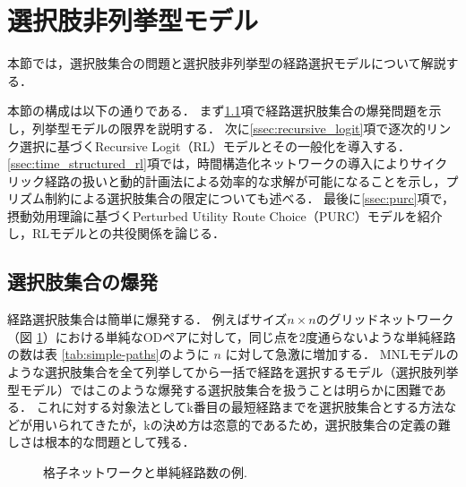 
\section{選択肢非列挙型モデル}\label{sec:choiceset}
本節では，選択肢集合の問題と選択肢非列挙型の経路選択モデルについて解説する．

本節の構成は以下の通りである．
まず\ref{ssec:choiceset_explosion}項で経路選択肢集合の爆発問題を示し，列挙型モデルの限界を説明する．
次に\ref{ssec:recursive_logit}項で逐次的リンク選択に基づくRecursive Logit（RL）モデルとその一般化を導入する．
\ref{ssec:time_structured_rl}項では，時間構造化ネットワークの導入によりサイクリック経路の扱いと動的計画法による効率的な求解が可能になることを示し，プリズム制約による選択肢集合の限定についても述べる．
最後に\ref{ssec:purc}項で，摂動効用理論に基づくPerturbed Utility Route Choice（PURC）モデルを紹介し，RLモデルとの共役関係を論じる．

\subsection{選択肢集合の爆発}\label{ssec:choiceset_explosion}
経路選択肢集合は簡単に爆発する．
例えばサイズ$n \times n$のグリッドネットワーク（図 \ref{fig:grid-paths}）における単純なODペアに対して，同じ点を2度通らないような単純経路の数は表 \ref{tab:simple-paths}のように $n$ に対して急激に増加する．
MNLモデルのような選択肢集合を全て列挙してから一括で経路を選択するモデル（選択肢列挙型モデル）ではこのような爆発する選択肢集合を扱うことは明らかに困難である．
これに対する対象法としてk番目の最短経路までを選択肢集合とする方法などが用いられてきたが，kの決め方は恣意的であるため，選択肢集合の定義の難しさは根本的な問題として残る．

\begin{figure}[htb]
  \centering
  \resizebox{.4\linewidth}{!}{}
  \caption{格子ネットワークと単純経路数の例.}
  \label{fig:grid-paths}
\end{figure}

